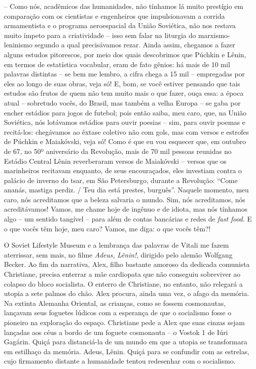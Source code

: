-- Como nós, acadêmicos das humanidades, não tínhamos lá muito prestígio
em comparação com os cientistas e engenheiros que impulsionavam a
corrida armamentista e o programa aeroespacial da União Soviética, não
nos restava muito ímpeto para a criatividade -- isso sem falar na
liturgia do marxismo-leninismo segundo a qual precisávamos rezar. Ainda
assim, chegamos a fazer alguns estudos pitorescos, por meio dos quais
descobrimos que Púchkin e Lênin, em termos de estatística vocabular,
eram de fato gênios: há mais de 10 mil palavras distintas -- se bem me
lembro, a cifra chega a 15 mil -- empregadas por eles ao longo de suas
obras, veja só! E, bom, se você estiver pensando que tais estudos são
frutos de quem não tem muito mais o que fazer, ouça essa: a época atual
-- sobretudo vocês, do Brasil, mas também a velha Europa -- se gaba por
encher estádios para jogos de futebol; pois então saiba, meu caro, que,
na União Soviética, nós lotávamos estádios para ouvir poesias -- sim,
para ouvir poemas e recitá-los: chegávamos ao êxtase coletivo não com
gols, mas com versos e estrofes de Púchkin e Maiakóvski, veja só! Como é
que eu vou esquecer que, em outubro de 67, no 50º aniversário da
Revolução, mais de 70 mil pessoas reunidas no Estádio Central Lênin
reverberaram versos de Maiakóvski -- versos que os marinheiros recitavam
enquanto, de seus encouraçados, eles investiam contra o palácio de
inverno do tsar, em São Petersburgo, durante a Revolução: ``Come ananás,
mastiga perdiz. / Teu dia está prestes, burguês''. Naquele momento, meu
caro, nós acreditamos que a beleza salvaria o mundo. Sim, nós
acreditamos, nós acreditávamos! Vamos, me chame hoje de ingênuo e de
idiota, mas nós tínhamos algo -- um sentido tangível -- para além de
contas bancárias e redes de \emph{fast food.} E o que vocês têm hoje,
meu caro? Vamos, me diga: o que vocês têm?!

O Soviet Lifestyle Museum e a lembrança das palavras de Vitali me fazem
aterrissar, sem mais, no filme \emph{Adeus, Lênin!}, dirigido pelo
alemão Wolfgang Becker. Ao fim da narrativa, Alex, filho bastante
amoroso da dedicada comunista Christiane, precisa enterrar a mãe
cardiopata que não conseguiu sobreviver ao colapso do bloco socialista.
O enterro de Christiane, no entanto, não relegará a utopia a sete palmos
do chão. Alex procura, ainda uma vez, o afago da memória. Na extinta
Alemanha Oriental, as crianças, como se fossem cosmonautas, lançavam
seus foguetes lúdicos com a esperança de que o socialismo fosse o
pioneiro na exploração do espaço. Christiane pede a Alex que suas cinzas
sejam lançadas aos céus a bordo de um foguete cosmonauta -- o Vostok 1
de Iúri Gagárin. Quiçá para distanciá-la de um mundo em que a utopia se
transformara em estilhaço da memória. Adeus, Lênin. Quiçá para se
confundir com as estrelas, cujo firmamento distante a humanidade tentou
redesenhar com o socialismo.

